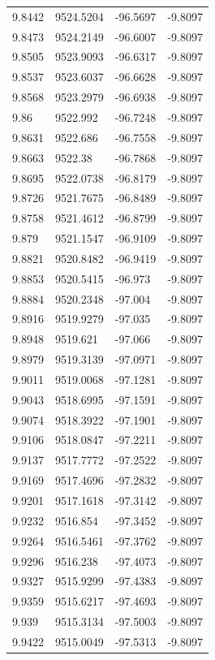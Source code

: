 \begin{table}[H]
\begin{tabular}{llll}
9.8442 & 9524.5204 & -96.5697 & -9.8097 \\
9.8473 & 9524.2149 & -96.6007 & -9.8097 \\
9.8505 & 9523.9093 & -96.6317 & -9.8097 \\
9.8537 & 9523.6037 & -96.6628 & -9.8097 \\
9.8568 & 9523.2979 & -96.6938 & -9.8097 \\
9.86 & 9522.992 & -96.7248 & -9.8097 \\
9.8631 & 9522.686 & -96.7558 & -9.8097 \\
9.8663 & 9522.38 & -96.7868 & -9.8097 \\
9.8695 & 9522.0738 & -96.8179 & -9.8097 \\
9.8726 & 9521.7675 & -96.8489 & -9.8097 \\
9.8758 & 9521.4612 & -96.8799 & -9.8097 \\
9.879 & 9521.1547 & -96.9109 & -9.8097 \\
9.8821 & 9520.8482 & -96.9419 & -9.8097 \\
9.8853 & 9520.5415 & -96.973 & -9.8097 \\
9.8884 & 9520.2348 & -97.004 & -9.8097 \\
9.8916 & 9519.9279 & -97.035 & -9.8097 \\
9.8948 & 9519.621 & -97.066 & -9.8097 \\
9.8979 & 9519.3139 & -97.0971 & -9.8097 \\
9.9011 & 9519.0068 & -97.1281 & -9.8097 \\
9.9043 & 9518.6995 & -97.1591 & -9.8097 \\
9.9074 & 9518.3922 & -97.1901 & -9.8097 \\
9.9106 & 9518.0847 & -97.2211 & -9.8097 \\
9.9137 & 9517.7772 & -97.2522 & -9.8097 \\
9.9169 & 9517.4696 & -97.2832 & -9.8097 \\
9.9201 & 9517.1618 & -97.3142 & -9.8097 \\
9.9232 & 9516.854 & -97.3452 & -9.8097 \\
9.9264 & 9516.5461 & -97.3762 & -9.8097 \\
9.9296 & 9516.238 & -97.4073 & -9.8097 \\
9.9327 & 9515.9299 & -97.4383 & -9.8097 \\
9.9359 & 9515.6217 & -97.4693 & -9.8097 \\
9.939 & 9515.3134 & -97.5003 & -9.8097 \\
9.9422 & 9515.0049 & -97.5313 & -9.8097 \\

\end{tabular}
\end{table}

